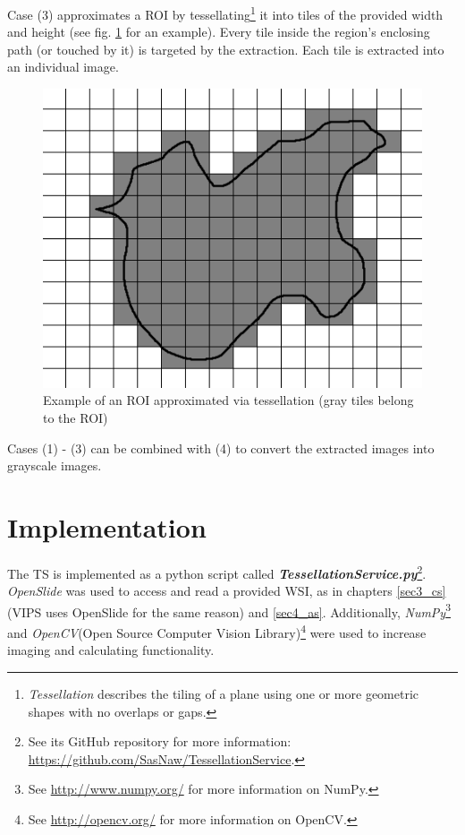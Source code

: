 Case (3) approximates a ROI by tessellating\footnote{
	\emph{Tessellation} describes the tiling of a plane using one or more geometric shapes with no overlaps or gaps\cite{Clifford09}.
} it into tiles of the provided width and height (see fig. \ref{fig5_tesExample} for an example). Every tile inside the region's enclosing path (or touched by it) is targeted by the extraction. Each tile is extracted into an individual image.

\begin{figure}[H]
	\begin{center}
		\includegraphics[scale=0.5]{img/tessellation.png}
		\caption{Example of an ROI approximated via tessellation (gray tiles belong to the ROI)}
		\label{fig5_tesExample}
	\end{center}
\end{figure}

Cases (1) - (3) can be combined with (4) to convert the extracted images into grayscale images.

\section{Implementation}
\label{sec5_impl}
The TS is implemented as a python script called \textbf{\emph{TessellationService.py}}\footnote{
	See its GitHub repository for more information: \url{https://github.com/SasNaw/TessellationService}.
}. \emph{OpenSlide} was used to access and read a provided WSI, as in chapters \ref{sec3_cs} (VIPS uses OpenSlide for the same reason\cite{cupitt96}) and \ref{sec4_as}. Additionally, \emph{NumPy}\footnote{
	See \url{http://www.numpy.org/} for more information on NumPy.
} and \emph{OpenCV}(Open Source Computer Vision Library)\footnote{
	See \url{http://opencv.org/} for more information on OpenCV.
} were used to increase imaging and calculating functionality.

